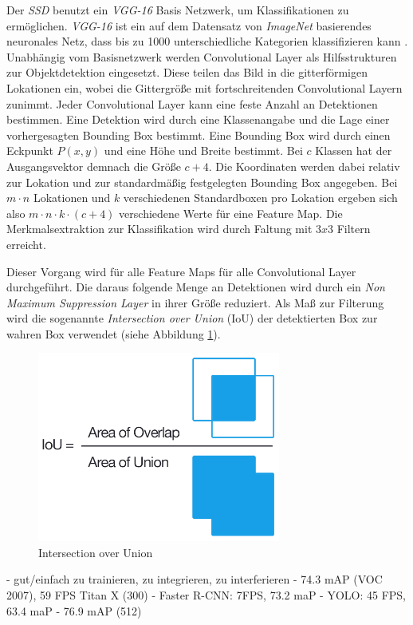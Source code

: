 Der \textit{SSD} benutzt ein \textit{VGG-16} Basis Netzwerk, um Klassifikationen zu ermöglichen. \textit{VGG-16} ist ein auf dem Datensatz von \textit{ImageNet} basierendes neuronales Netz, dass bis zu 1000 unterschiedliche Kategorien klassifizieren kann \cite{MathWorks.2019b}. Unabhängig vom Basisnetzwerk werden Convolutional Layer als Hilfsstrukturen zur Objektdetektion eingesetzt. Diese teilen das Bild in die gitterförmigen Lokationen ein, wobei die Gittergröße mit fortschreitenden Convolutional Layern zunimmt. Jeder Convolutional Layer kann eine feste Anzahl an Detektionen bestimmen. Eine Detektion wird durch eine Klassenangabe und die Lage einer vorhergesagten Bounding Box bestimmt. Eine Bounding Box wird durch einen Eckpunkt $P(x,y)$ und eine Höhe und Breite bestimmt. Bei $c$ Klassen hat der Ausgangsvektor demnach die Größe $c+4$. Die Koordinaten werden dabei relativ zur Lokation und zur standardmäßig festgelegten Bounding Box angegeben. Bei $m \cdot n$ Lokationen und $k$ verschiedenen Standardboxen pro Lokation ergeben sich also $m \cdot n \cdot k \cdot (c+4)$ verschiedene Werte für eine Feature Map. Die Merkmalsextraktion zur Klassifikation wird durch Faltung mit $3x3$ Filtern erreicht. \cite[S. 3]{ssd.20161229} 

Dieser Vorgang wird für alle Feature Maps für alle Convolutional Layer durchgeführt. Die daraus folgende Menge an Detektionen wird durch ein \textit{Non Maximum Suppression Layer} in ihrer Größe reduziert. Als Maß zur Filterung wird die sogenannte \textit{Intersection over Union} (IoU) der detektierten Box zur wahren Box verwendet (siehe Abbildung \ref{iou}). \cite[S. 3]{ssd.20161229} 

\begin{figure}[ht]
	\begin{center}
		\includegraphics[width=8cm]{Bilder/iou_equation.png} 
		\caption[Intersection over Union]{Intersection over Union \cite{AdrianRosebrock.20161107}}
		\label{iou}
	\end{center}
\end{figure}

- gut/einfach zu trainieren, zu integrieren, zu interferieren
- 74.3 mAP (VOC 2007), 59 FPS Titan X (300)
	- Faster R-CNN: 7FPS, 73.2 maP
	- YOLO: 45 FPS, 63.4 maP
- 76.9 mAP (512)
